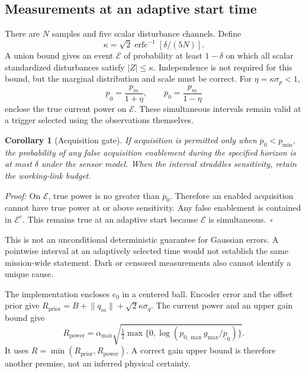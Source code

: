 \documentclass[10pt,journal]{IEEEtran}
\newtheorem{corollary}{Corollary}
\newcommand{\norm}[1]{\lVert#1\rVert}
\begin{document}
\subsection{Measurements at an adaptive start time}
There are $N$ samples and five scalar disturbance channels. Define
\begin{equation}
 \kappa=\sqrt2\operatorname{erfc}^{-1}[\delta/(5N)].
\end{equation}
A union bound gives an event $\mathcal E$ of probability at least $1-\delta$ on which all scalar standardized disturbances satisfy $|Z|\leq\kappa$. Independence is not required for this bound, but the marginal distribution and scale must be correct. For $\eta=\kappa\sigma_p<1$,
\begin{equation}
 \underline p_0=\frac{p_m}{1+\eta},\qquad
 \overline p_0=\frac{p_m}{1-\eta}
 \label{eq:interval}
\end{equation}
enclose the true current power on $\mathcal E$. These simultaneous intervals remain valid at a trigger selected using the observations themselves.

\begin{corollary}[Acquisition gate]
If acquisition is permitted only when $\overline p_0<p_{\min}$, the probability of any false acquisition enablement during the specified horizon is at most $\delta$ under the sensor model. When the interval straddles sensitivity, retain the working-link budget.
\end{corollary}
\emph{Proof:} On $\mathcal E$, true power is no greater than $\overline p_0$. Therefore an enabled acquisition cannot have true power at or above sensitivity. Any false enablement is contained in $\mathcal E^c$. This remains true at an adaptive start because $\mathcal E$ is simultaneous.~$\square$

This is not an unconditional deterministic guarantee for Gaussian errors. A pointwise interval at an adaptively selected time would not establish the same mission-wide statement. Dark or censored measurements also cannot identify a unique cause.

The implementation encloses $e_0$ in a centered ball. Encoder error and the offset prior give $R_{\mathrm{prior}}=B+\norm{q_m}+\sqrt2\kappa\sigma_q$. The current power and an upper gain bound give
\begin{equation}
 R_{\mathrm{power}}=\alpha_{\max}
 \sqrt{\tfrac12\max\{0,\log(p_{0,\max}g_{\max}/\underline p_0)\}}.
\end{equation}
It uses $R=\min(R_{\mathrm{prior}},R_{\mathrm{power}})$. A correct gain upper bound is therefore another premise, not an inferred physical certainty.
\end{document}
